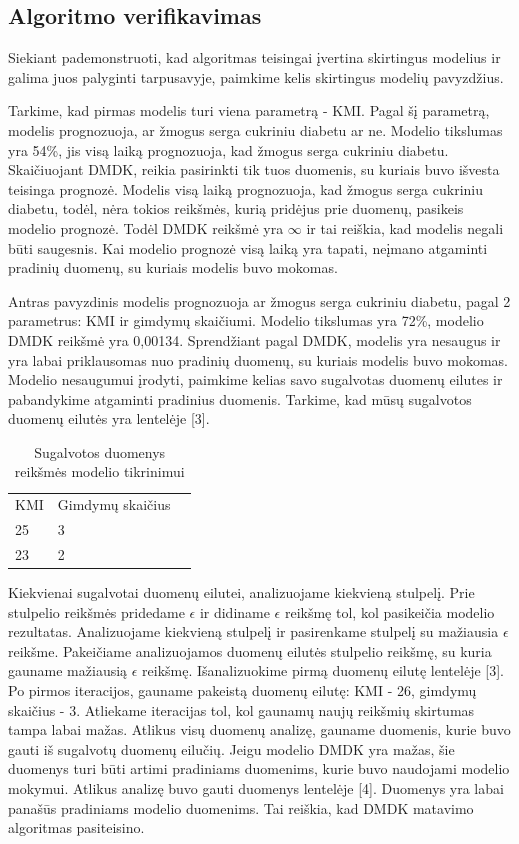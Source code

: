 \documentclass{VUMIFInfBakalaurinis}
\begin{document}
\subsection{Algoritmo verifikavimas}
\par Siekiant pademonstruoti, kad algoritmas teisingai įvertina skirtingus modelius ir galima juos palyginti tarpusavyje, paimkime kelis skirtingus modelių pavyzdžius.
\par Tarkime, kad pirmas modelis turi viena parametrą - KMI. Pagal šį parametrą, modelis prognozuoja, ar žmogus serga cukriniu diabetu ar ne. Modelio tikslumas yra 54\%, jis visą laiką prognozuoja, kad žmogus serga cukriniu diabetu. Skaičiuojant DMDK, reikia pasirinkti tik tuos duomenis, su kuriais buvo išvesta teisinga prognozė. Modelis visą laiką prognozuoja, kad žmogus serga cukriniu diabetu, todėl, nėra tokios reikšmės, kurią pridėjus prie duomenų, pasikeis modelio prognozė. Todėl DMDK reikšmė yra $\infty$ ir tai reiškia, kad modelis negali būti saugesnis. Kai modelio prognozė visą laiką yra tapati, neįmano atgaminti pradinių duomenų, su kuriais modelis buvo mokomas.
\par Antras pavyzdinis modelis prognozuoja ar žmogus serga cukriniu diabetu, pagal 2 parametrus: KMI ir gimdymų skaičiumi. Modelio tikslumas yra 72\%, modelio DMDK reikšmė yra 0,00134. Sprendžiant pagal DMDK, modelis yra nesaugus ir yra labai priklausomas nuo pradinių duomenų, su kuriais modelis buvo mokomas. Modelio nesaugumui įrodyti, paimkime kelias savo sugalvotas duomenų eilutes ir pabandykime atgaminti pradinius duomenis. Tarkime, kad mūsų sugalvotos duomenų eilutės yra lentelėje [3].

\begin{table}[h]
\centering
\begin{tabular}{|l|l|l|}
\cline{1-2}
KMI & Gimdymų skaičius \\\cline{1-2}
25      & 3 \\\cline{1-2}
23       & 2 \\\cline{1-2}
\end{tabular}
\caption{Sugalvotos duomenys reikšmės modelio tikrinimui}
\label{tab:my-table}
\end{table}

\par Kiekvienai sugalvotai duomenų eilutei, analizuojame kiekvieną stulpelį. Prie stulpelio reikšmės pridedame $\epsilon$ ir didiname $\epsilon$ reikšmę tol, kol pasikeičia modelio rezultatas. Analizuojame kiekvieną stulpelį ir pasirenkame stulpelį su mažiausia $\epsilon$ reikšme. Pakeičiame analizuojamos duomenų eilutės stulpelio reikšmę, su kuria gauname mažiausią $\epsilon$ reikšmę. Išanalizuokime pirmą duomenų eilutę lentelėje [3]. Po pirmos iteracijos, gauname pakeistą duomenų eilutę: KMI - 26, gimdymų skaičius - 3. Atliekame iteracijas tol, kol gaunamų naujų reikšmių skirtumas tampa labai mažas. Atlikus visų duomenų analizę, gauname duomenis, kurie buvo gauti iš sugalvotų duomenų eilučių. Jeigu modelio DMDK yra mažas, šie duomenys turi būti artimi pradiniams duomenims, kurie buvo naudojami modelio mokymui. Atlikus analizę buvo gauti duomenys lentelėje [4]. Duomenys yra labai panašūs pradiniams modelio duomenims. Tai reiškia, kad DMDK matavimo algoritmas pasiteisino.
\end{document}

